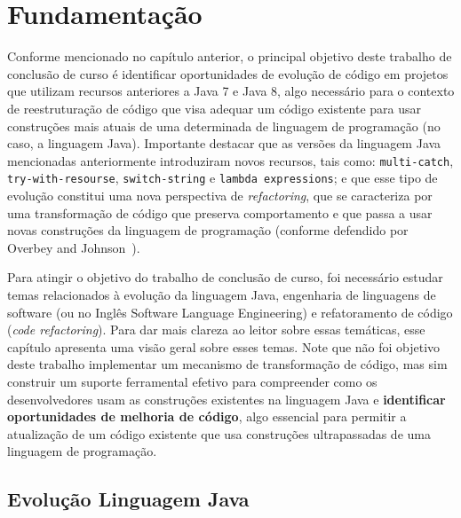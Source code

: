 %
%
\chapter{Fundamentaç\~{a}o}

Conforme mencionado no cap\'{i}tulo anterior, o principal objetivo deste trabalho de conclus\~{a}o de curso \'{e} 
identificar oportunidades de evoluç\~{a}o de c\'{o}digo em projetos que utilizam recursos anteriores a Java 7 e Java 8, 
algo necess\'{a}rio para o contexto de reestrutura\c c\~{a}o de c\'{o}digo que visa adequar um c\'{o}digo 
existente para usar constru\c c\~{o}es mais atuais de uma determinada de linguagem de programa\c c\~{a}o 
(no caso, a linguagem Java). Importante destacar que as vers\~{o}es da linguagem Java mencionadas anteriormente
introduziram novos recursos, tais como: \texttt{multi-catch}, \texttt{try-with-resourse}, \texttt{switch-string} 
e \texttt{lambda expressions}; e que esse tipo de evoluç\~{a}o constitui uma nova perspectiva de \textit{refactoring}, que se caracteriza 
por uma transforma\c c\~{a}o de c\'{o}digo que preserva comportamento e que passa a usar  
novas constru\c c\~{o}es da linguagem de programa\c c\~{a}o (conforme defendido por Overbey and Johnson~\cite{Overbey:2009}). 

Para atingir o objetivo do trabalho de conclus\~{a}o de curso, foi necess\'{a}rio estudar temas relacionados 
\`{a} evolu\c c\~{a}o da linguagem Java, engenharia de linguagens de software (ou no Ingl\^{e}s Software 
Language Engineering) e refatoramento de c\'{o}digo (\emph{code refactoring}).  Para dar mais clareza ao leitor 
sobre essas tem\'{a}ticas, esse cap\'{i}tulo apresenta uma vis\~{a}o geral sobre esses temas. Note que n\~{a}o foi objetivo
deste trabalho implementar um mecanismo de transforma\c c\~{a}o de c\'{o}digo, mas sim construir um suporte ferramental 
efetivo para compreender como os desenvolvedores usam as constru\c c\~{o}es existentes na linguagem Java e {\bf identificar 
oportunidades de melhoria de c\'{o}digo}, algo essencial para permitir a atualiza\c c\~{a}o de um c\'{o}digo existente 
que usa constru\c c\~{o}es ultrapassadas de uma linguagem de programa\c c\~{a}o. 
 
\section{Evoluç\~{a}o Linguagem Java}\label{sec:evolucaoJava}



